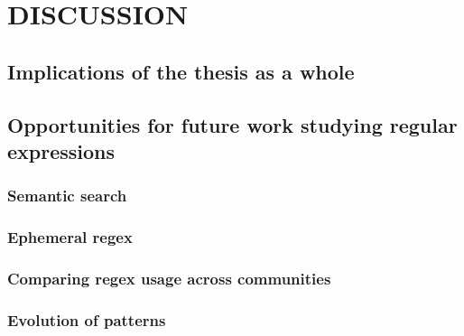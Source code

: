 \chapter{DISCUSSION}
\section{Implications of the thesis as a whole}

\section{Opportunities for future work studying regular expressions}
\subsection{Semantic search}
\subsection{Ephemeral regex}
\subsection{Comparing regex usage across communities}
\subsection{Evolution of patterns}
